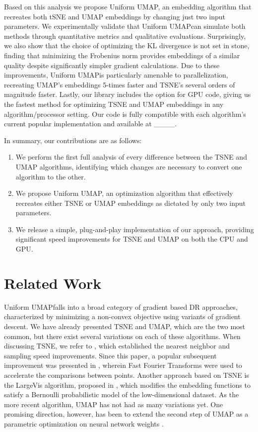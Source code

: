 \documentclass[sigconf, nonacm]{acmart}
\newcommand\ourmethod{Uniform UMAP}
\begin{document}
Based on this analysis we propose \ourmethod, an embedding algorithm that recreates both tSNE and UMAP embeddings by changing just two input parameters.
We experimentally validate that \ourmethod can simulate both methods through quantitative metrics and qualitative
evaluations. Surprisingly, we also show that the choice of optimizing the KL divergence is not set in stone, finding that minimizing the Frobenius norm provides
embeddings of a similar quality despite significantly simpler gradient calculations. Due to these improvements, \ourmethod is particularly amenable to
parallelization, recreating UMAP's embeddings 5-times faster and TSNE's several orders of magnitude faster.
Lastly, our library includes the option for GPU code, giving us the fastest method for optimizing TSNE and UMAP embeddings in any algorithm/processor setting.
Our code is fully compatible with each algorithm's current popular implementation and available at \_\_\_\_.

In summary, our contributions are as follows:
\begin{enumerate}
        \item We perform the first full analysis of every difference between the TSNE and UMAP algorithms, identifying which changes are necessary to
        convert one algorithm to the other.
        \item We propose \ourmethod, an optimization algorithm that effectively recreates either TSNE or UMAP embeddings as dictated by only two input
            parameters.
        \item We release a simple, plug-and-play implementation of our approach, providing significant speed improvements for TSNE and UMAP on both
        the CPU and GPU.
\end{enumerate}

\section{Related Work}

\ourmethod falls into a broad category of gradient based DR approaches, characterized by minimizing a non-convex objective using variants of gradient descent.
We have already presented TSNE and UMAP, which are the two most common, but there exist several variations on each of these algorithms. When discussing TSNE, we
refer to \cite{van2014accelerating}, which established the nearest neighbor and sampling speed improvements. Since this paper, a popular subsequent improvement
was presented in \cite{linderman2019fast}, wherein Fast Fourier Transforms were used to accelerate the comparisons between points. Another approach based on
TSNE is the LargeVis algorithm, proposed in \cite{tang2016visualizing}, which modifies the embedding functions to satisfy a Bernoulli probabilistic model of
the low-dimensional dataset. As the more recent algorithm, UMAP has not had as many variations yet. One promising direction, however, has been to extend the
second step of UMAP as a parametric optimization on neural network weights \cite{sainburg2020parametric}.
\end{document}
